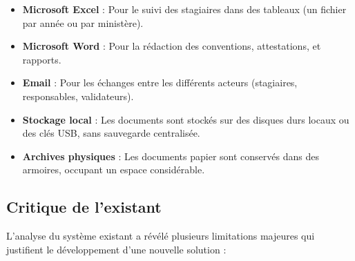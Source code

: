 \documentclass[12pt,a4paper]{report}
\begin{document}
\begin{itemize}[leftmargin=1cm]
    \item \textbf{Microsoft Excel} : Pour le suivi des stagiaires dans des tableaux (un fichier par année ou par ministère).
    
    \item \textbf{Microsoft Word} : Pour la rédaction des conventions, attestations, et rapports.
    
    \item \textbf{Email} : Pour les échanges entre les différents acteurs (stagiaires, responsables, validateurs).
    
    \item \textbf{Stockage local} : Les documents sont stockés sur des disques durs locaux ou des clés USB, sans sauvegarde centralisée.
    
    \item \textbf{Archives physiques} : Les documents papier sont conservés dans des armoires, occupant un espace considérable.
\end{itemize}

\subsection{Critique de l'existant}

L'analyse du système existant a révélé plusieurs limitations majeures qui justifient le développement d'une nouvelle solution :
\end{document}
